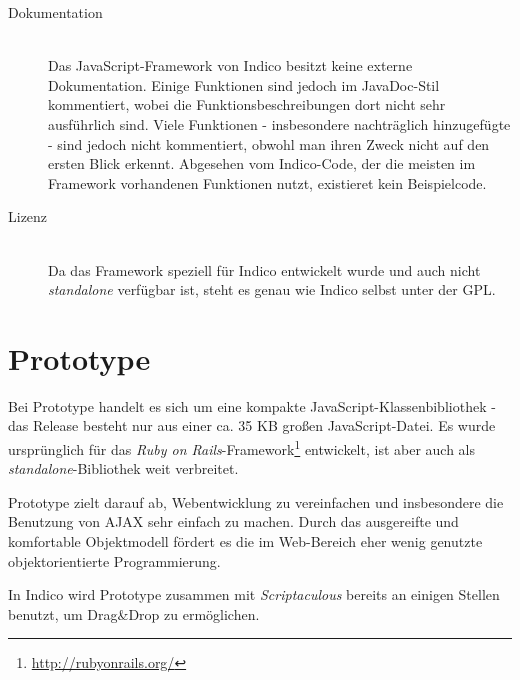 \begin{description}
\item[Dokumentation] \hfill \\
Das JavaScript-Framework von Indico besitzt keine externe Dokumentation. Einige Funktionen sind
jedoch im JavaDoc-Stil kommentiert, wobei die Funktionsbeschreibungen dort nicht sehr ausführlich
sind. Viele Funktionen - insbesondere nachträglich hinzugefügte - sind jedoch nicht kommentiert,
obwohl man ihren Zweck nicht auf den ersten Blick erkennt. Abgesehen vom Indico-Code, der die
meisten im Framework vorhandenen Funktionen nutzt, existieret kein Beispielcode.

\item[Lizenz] \hfill \\
Da das Framework speziell für Indico entwickelt wurde und auch nicht \emph{standalone} verfügbar
ist, steht es genau wie Indico selbst unter der GPL.
\end{description}





\section{Prototype}
Bei Prototype handelt es sich um eine kompakte JavaScript-Klassenbibliothek - das Release
besteht nur aus einer ca. 35 KB großen JavaScript-Datei. Es wurde ursprünglich für das \emph{Ruby on
Rails}-Framework\footnote{\href{http://rubyonrails.org/}{http://rubyonrails.org/}} entwickelt, ist
aber auch als \emph{standalone}-Bibliothek weit verbreitet.

Prototype zielt darauf ab, Webentwicklung zu vereinfachen und insbesondere die Benutzung von AJAX
sehr einfach zu machen. Durch das ausgereifte und komfortable Objektmodell fördert es die im
Web-Bereich eher wenig genutzte objektorientierte Programmierung.

In Indico wird Prototype zusammen mit \emph{Scriptaculous} bereits an einigen Stellen benutzt, um
Drag\&Drop zu ermöglichen.

